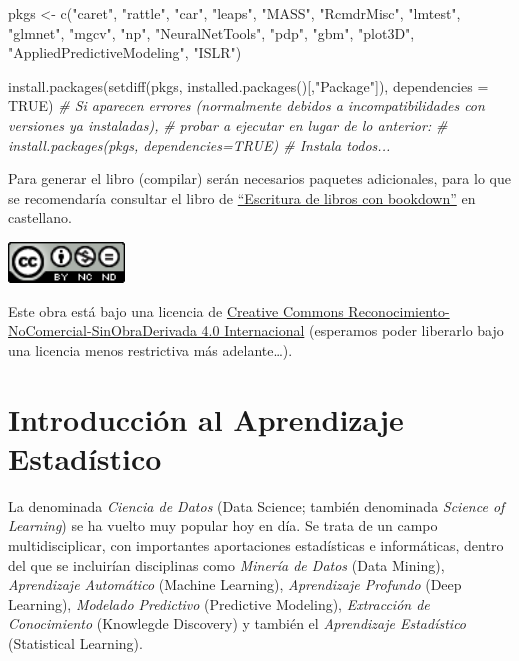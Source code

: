 \documentclass[
]{book}
\newenvironment{Shaded}{\begin{snugshade}}{\end{snugshade}}
\newcommand{\AttributeTok}[1]{\textcolor[rgb]{0.77,0.63,0.00}{#1}}
\newcommand{\CommentTok}[1]{\textcolor[rgb]{0.56,0.35,0.01}{\textit{#1}}}
\newcommand{\ConstantTok}[1]{\textcolor[rgb]{0.00,0.00,0.00}{#1}}
\newcommand{\FunctionTok}[1]{\textcolor[rgb]{0.00,0.00,0.00}{#1}}
\newcommand{\NormalTok}[1]{#1}
\newcommand{\OtherTok}[1]{\textcolor[rgb]{0.56,0.35,0.01}{#1}}
\newcommand{\StringTok}[1]{\textcolor[rgb]{0.31,0.60,0.02}{#1}}
\theoremstyle{break}
\theoremstyle{definition}
\theoremstyle{definition}
\theoremstyle{definition}
\theoremstyle{definition}
\theoremstyle{remark}
\begin{document}
\begin{Shaded}
\begin{Highlighting}[]
\NormalTok{pkgs }\OtherTok{\textless{}{-}} \FunctionTok{c}\NormalTok{(}\StringTok{"caret"}\NormalTok{, }\StringTok{"rattle"}\NormalTok{, }\StringTok{"car"}\NormalTok{, }\StringTok{"leaps"}\NormalTok{, }\StringTok{"MASS"}\NormalTok{, }\StringTok{"RcmdrMisc"}\NormalTok{, }
          \StringTok{"lmtest"}\NormalTok{, }\StringTok{"glmnet"}\NormalTok{, }\StringTok{"mgcv"}\NormalTok{, }\StringTok{"np"}\NormalTok{, }\StringTok{"NeuralNetTools"}\NormalTok{, }\StringTok{"pdp"}\NormalTok{, }\StringTok{"gbm"}\NormalTok{,}
          \StringTok{"plot3D"}\NormalTok{, }\StringTok{"AppliedPredictiveModeling"}\NormalTok{, }\StringTok{"ISLR"}\NormalTok{)}

\FunctionTok{install.packages}\NormalTok{(}\FunctionTok{setdiff}\NormalTok{(pkgs, }\FunctionTok{installed.packages}\NormalTok{()[,}\StringTok{"Package"}\NormalTok{]), }\AttributeTok{dependencies =} \ConstantTok{TRUE}\NormalTok{)}
\CommentTok{\# Si aparecen errores (normalmente debidos a incompatibilidades con versiones ya instaladas), }
\CommentTok{\# probar a ejecutar en lugar de lo anterior:}
\CommentTok{\# install.packages(pkgs, dependencies=TRUE) \# Instala todos...}
\end{Highlighting}
\end{Shaded}

Para generar el libro (compilar) serán necesarios paquetes adicionales,
para lo que se recomendaría consultar el libro de \href{https://rubenfcasal.github.io/bookdown_intro}{``Escritura de libros con bookdown''} en castellano.

\includegraphics[width=1.22in]{images/by-nc-nd-88x31}

Este obra está bajo una licencia de \href{https://creativecommons.org/licenses/by-nc-nd/4.0/deed.es_ES}{Creative Commons Reconocimiento-NoComercial-SinObraDerivada 4.0 Internacional}
(esperamos poder liberarlo bajo una licencia menos restrictiva más adelante\ldots).

\hypertarget{intro-AE}{%
\chapter{Introducción al Aprendizaje Estadístico}\label{intro-AE}}

La denominada \emph{Ciencia de Datos} (Data Science; también denominada \emph{Science of Learning}) se ha vuelto muy popular hoy en día.
Se trata de un campo multidisciplicar, con importantes aportaciones estadísticas e informáticas, dentro del que se incluirían disciplinas como \emph{Minería de Datos} (Data Mining), \emph{Aprendizaje Automático} (Machine Learning), \emph{Aprendizaje Profundo} (Deep Learning), \emph{Modelado Predictivo} (Predictive Modeling), \emph{Extracción de Conocimiento} (Knowlegde Discovery) y también el \emph{Aprendizaje Estadístico} (Statistical Learning).
\end{document}
